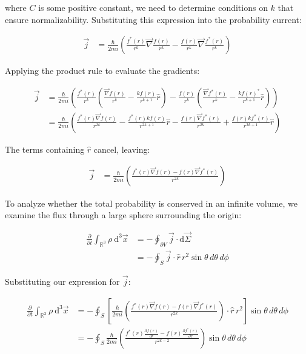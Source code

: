 \documentclass[italian]{HKNdocument}
\begin{document}
where $C$ is some positive constant, we need to determine conditions on $k$ that ensure normalizability. Substituting this expression into the probability current:

\begin{align*}
\vec{j} &= \frac{\hbar}{2 m i}\left(\frac{f^{*}(r)}{r^{k}} \vec{\nabla} \frac{f(r)}{r^{k}}-\frac{f(r)}{r^{k}} \vec{\nabla} \frac{f^{*}(r)}{r^{k}}\right)
\end{align*}

Applying the product rule to evaluate the gradients:

\begin{align*}
\vec{j} &= \frac{\hbar}{2 m i}\left(\frac{f^{*}(r)}{r^{k}}\left(\frac{\vec{\nabla} f(r)}{r^{k}}-\frac{k f(r)}{r^{k+1}}\hat{r}\right)-\frac{f(r)}{r^{k}}\left(\frac{\vec{\nabla} f^{*}(r)}{r^{k}}-\frac{k f(r)^{*}}{r^{k+1}}\hat{r}\right)\right) \\
&= \frac{\hbar}{2 m i}\left(\frac{f^{*}(r) \vec{\nabla} f(r)}{r^{2 k}}-\frac{f^{*}(r) k f(r)}{r^{2 k+1}}\hat{r}-\frac{f(r) \vec{\nabla} f^{*}(r)}{r^{2 k}}+\frac{f(r) k f^{*}(r)}{r^{2 k+1}}\hat{r}\right) \tag{1.41}
\end{align*}

The terms containing $\hat{r}$ cancel, leaving:

\begin{align*}
\vec{j} &= \frac{\hbar}{2 m i}\left(\frac{f^{*}(r) \vec{\nabla} f(r)-f(r) \vec{\nabla} f^{*}(r)}{r^{2 k}}\right)
\end{align*}

To analyze whether the total probability is conserved in an infinite volume, we examine the flux through a large sphere surrounding the origin:

\begin{align*}
\frac{\partial}{\partial t} \int_{\mathbb{R}^{3}} \rho \mathrm{~d}^{3} \vec{x} &= -\oint_{\partial V} \vec{j} \cdot \mathrm{d} \vec{\Sigma} \\
&= -\oint_{S} \vec{j} \cdot \hat{r} \, r^{2} \sin\theta \, d\theta \, d\phi
\end{align*}

Substituting our expression for $\vec{j}$:

\begin{align*}
\frac{\partial}{\partial t} \int_{\mathbb{R}^{3}} \rho \mathrm{~d}^{3} \vec{x} &= -\oint_{S}\left[\frac{\hbar}{2 m i}\left(\frac{f^{*}(r) \vec{\nabla} f(r)-f(r) \vec{\nabla} f^{*}(r)}{r^{2 k}}\right) \cdot \hat{r} \, r^{2}\right] \sin\theta \, d\theta \, d\phi \tag{1.42} \\
&= -\oint_{S} \frac{\hbar}{2 m i}\left(\frac{f^{*}(r) \frac{\partial f(r)}{\partial r}-f(r) \frac{\partial f^{*}(r)}{\partial r}}{r^{2 k-2}}\right) \sin\theta \, d\theta \, d\phi
\end{align*}
\end{document}
